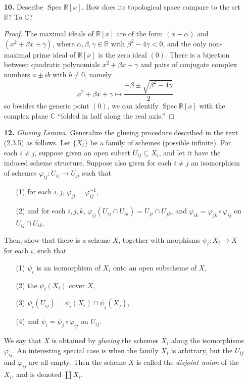\documentclass{article}
\newcommand{\R}{\mathbb{R}}
\newcommand{\C}{\mathbb{C}}
\DeclareMathOperator{\spec}{Spec}
\begin{document}
\begin{enumerate} [label=\textbf{\arabic*.}, leftmargin=0em]
\item[\textbf{10.}] Describe $\spec{\R[x]}$. How does its topological space compare to the set $\R$? To $\C$?

\begin{proof}
    The maximal ideals of $\R[x]$ are of the form $(x - \alpha)$ and $(x^2 + \beta x + \gamma)$, where $\alpha, \beta, \gamma \in \R$ with $\beta^2 - 4 \gamma < 0$, and the only non-maximal prime ideal of $\R[x]$ is the zero ideal $(0)$. There is a bijection between quadratic polynomials $x^2 + \beta x + \gamma$ and pairs of conjugate complex numbers $a \pm i b$ with $b \neq 0$, namely
    \begin{equation*}
        x^2 + \beta x + \gamma \mapsto \frac{-\beta \pm \sqrt{\beta^2 -4\gamma}}{2} 
    \end{equation*}
    so besides the generic point $(0)$, we can identify $\spec{\R[x]}$ with the complex plane $\C$ ``folded in half along the real axis.''
\end{proof}

\item[\textbf{12.}] \textit{Glueing Lemma.} Generalize the glueing procedure described in the text (2.3.5) as follows. Let $\{X_i\}$ be a family of schemes (possible infinite). For each $i \neq j$, suppose given an open subset $U_{ij} \subseteq X_i$, and let it have the induced scheme structure. Suppose also given for each $i \neq j$ an isomorphism of schemes $\varphi_{ij} : U_{ij} \to U_{ji}$ such that
\begin{itemize}
    \item[(1)] for each $i, j$, $\varphi_{ji} = \varphi_{ij}^{-1}$,
    \item[(2)] and for each $i, j, k$, $\varphi_{ij}(U_{ij} \cap U_{ik}) = U_{ji} \cap U_{jk}$, and $\varphi_{ik} = \varphi_{jk} \circ \varphi_{ij}$ on $U_{ij} \cap U_{ik}$.
\end{itemize}
Then, show that there is a scheme $X$, together with morphisms $\psi_i : X_i \to X$ for each $i$, such that
\begin{itemize}
    \item[(1)] $\psi_i$ is an isomorphism of $X_i$ onto an open subscheme of $X$,
    \item[(2)] the $\psi_i(X_i)$ cover $X$,
    \item[(3)] $\psi_i(U_{ij}) = \psi_i(X_i) \cap \psi_j(X_j)$,
    \item[(4)] and $\psi_i = \psi_j \circ \varphi_{ij}$ on $U_{ij}$.
\end{itemize}
We say that $X$ is obtained by \textit{glueing} the schemes $X_i$ along the isomorphisms $\varphi_{ij}$. An interesting special case is when the family $X_i$ is arbitrary, but the $U_{ij}$ and $\varphi_{ij}$ are all empty. Then the scheme $X$ is called the \textit{disjoint union} of the $X_i$, and is denoted $\coprod X_i$.


\end{enumerate}
\end{document}
